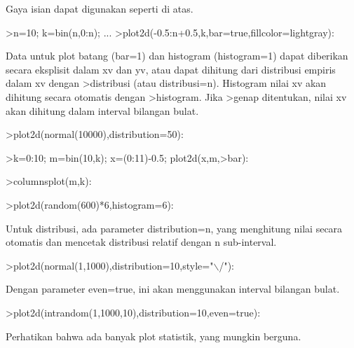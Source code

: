 \documentclass[a4paper,10pt]{article}
\begin{document}
\begin{eulernotebook}
\begin{eulercomment}
\begin{eulercomment}
\begin{eulercomment}
\begin{eulercomment}
\begin{eulercomment}
\begin{eulercomment}
\begin{eulercomment}
\begin{eulercomment}
\begin{eulercomment}
\begin{eulercomment}
\begin{eulercomment}
\begin{eulercomment}
\begin{eulercomment}
\begin{eulercomment}
\begin{eulercomment}
Gaya isian dapat digunakan seperti di atas.
\end{eulercomment}
\begin{eulerprompt}
>n=10; k=bin(n,0:n); ...
>plot2d(-0.5:n+0.5,k,bar=true,fillcolor=lightgray):
\end{eulerprompt}
\begin{eulercomment}
Data untuk plot batang (bar=1) dan histogram (histogram=1) dapat
diberikan secara eksplisit dalam xv dan yv, atau dapat dihitung dari
distribusi empiris dalam xv dengan \textgreater{}distribusi (atau distribusi=n).
Histogram nilai xv akan dihitung secara otomatis dengan \textgreater{}histogram.
Jika \textgreater{}genap ditentukan, nilai xv akan dihitung dalam interval bilangan
bulat.
\end{eulercomment}
\begin{eulerprompt}
>plot2d(normal(10000),distribution=50):
\end{eulerprompt}
\begin{eulerprompt}
>k=0:10; m=bin(10,k); x=(0:11)-0.5; plot2d(x,m,>bar):
\end{eulerprompt}
\begin{eulerprompt}
>columnsplot(m,k):
\end{eulerprompt}
\begin{eulerprompt}
>plot2d(random(600)*6,histogram=6):
\end{eulerprompt}
\begin{eulercomment}
Untuk distribusi, ada parameter distribution=n, yang menghitung nilai
secara otomatis dan mencetak distribusi relatif dengan n sub-interval.
\end{eulercomment}
\begin{eulerprompt}
>plot2d(normal(1,1000),distribution=10,style="\(\backslash\)/"):
\end{eulerprompt}
\begin{eulercomment}
Dengan parameter even=true, ini akan menggunakan interval bilangan
bulat.
\end{eulercomment}
\begin{eulerprompt}
>plot2d(intrandom(1,1000,10),distribution=10,even=true):
\end{eulerprompt}
\begin{eulercomment}
Perhatikan bahwa ada banyak plot statistik, yang mungkin berguna.

\end{eulercomment}
\end{eulercomment}
\end{eulercomment}
\end{eulercomment}
\end{eulercomment}
\end{eulercomment}
\end{eulercomment}
\end{eulercomment}
\end{eulercomment}
\end{eulercomment}
\end{eulercomment}
\end{eulercomment}
\end{eulercomment}
\end{eulercomment}
\end{eulercomment}
\end{eulernotebook}
\end{document}
